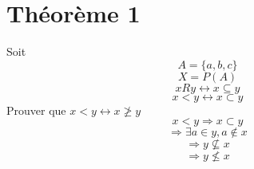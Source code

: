 \documentclass[a4paper,12pt]{article}
\begin{document}
\section{Théorème 1}
	Soit
	\[A = \{a, b, c\}\]
	\[X = P(A)\]
	\[x R y \leftrightarrow x \subseteq y \]
	\[ x < y \leftrightarrow x \subset y  \]
	Prouver que $ x < y \leftrightarrow x \ngeq y$\\
	\linebreak
	\[ x < y \Longrightarrow x \subset y\]
	\[ \Longrightarrow \exists a \in y , a \notin x \]
	\[ \Longrightarrow y \not \subseteq x \]
	\[ \Longrightarrow y \not\leq x \]
\newpage
\end{document}
